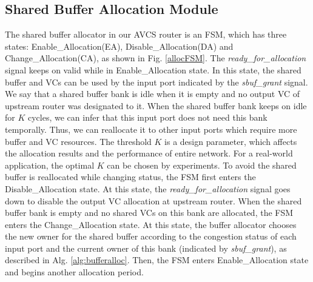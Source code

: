 \documentclass[paper]{ieice}
\begin{document}
\subsection{Shared Buffer Allocation Module}\label{bufmanage}
The shared buffer allocator in our AVCS router is an FSM, which has three states: Enable\_Allocation(EA), Disable\_Allocation(DA) and Change\_Allocation(CA), as shown in Fig. \ref{allocFSM}. The \emph{ready\_for\_allocation} signal keeps on valid while in Enable\_Allocation state. In this state, the shared buffer and VCs can be used by the input port indicated by the \emph{sbuf\_grant} signal. We say that a shared buffer bank is idle when it is empty and no output VC of upstream router was designated to it. When the shared buffer bank keeps on idle for $K$ cycles, we can infer that this input port does not need this bank temporally. Thus, we can reallocate it to other input ports which require more buffer and VC resources. The threshold $K$ is a design parameter, which affects the allocation results and the performance of entire network. For a real-world application, the optimal $K$ can be chosen by experiments. To avoid the shared buffer is reallocated while changing status, the FSM first enters the Disable\_Allocation state. At this state, the \emph{ready\_for\_allocation} signal goes down to disable the output VC allocation at upstream router. When the shared buffer bank is empty and no shared VCs on this bank are allocated, the FSM enters the Change\_Allocation state. At this state, the buffer allocator chooses the new owner for the shared buffer according to the congestion status of each input port and the current owner of this bank (indicated by \emph{sbuf\_grant}), as described in Alg. \ref{alg:bufferalloc}. Then, the FSM enters Enable\_Allocation state and begins another allocation period.
\end{document}
